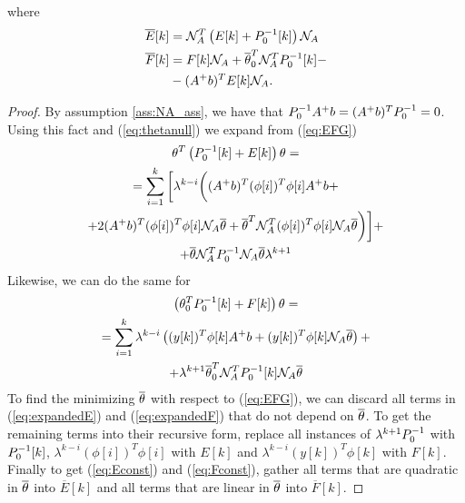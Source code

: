 where
\begin{align}
        \overline{E}[k] &= \mathcal{N}_A^T\left(E[k] + P_0^{-1}[k]\right)\mathcal{N}_A \label{eq:Econst}\\
        \overline{F}[k] &= F[k]\mathcal{N}_A + \overline{\theta}_0^T\mathcal{N}_A^TP_0^{-1}[k] - \notag \\
        &-(A^+b)^TE[k]\mathcal{N}_A \label{eq:Fconst}.
\end{align}
\begin{proof}
    By assumption \ref{ass:NA_ass}, we have that $P_0^{-1} A^+b = (A^+b)^TP_0^{-1} = 0$.
    Using this fact and (\ref{eq:thetanull}) we expand from (\ref{eq:EFG})
    \begin{equation}
        \begin{gathered}
            \theta^T\left(P_0^{-1}[k] + E[k]\right)\theta = \\
            = \sum\limits_{i=1}^k \bigg{[} \lambda^{k-i}\bigg{(}(A^+b)^T(\phi[i])^T\phi[i]A^+b
            + \\
            + 2(A^+b)^T(\phi[i])^T\phi[i]\mathcal{N}_A\overline{\theta} + \overline{\theta}^T\mathcal{N}_A^T(\phi[i])^T\phi[i]\mathcal{N}_A\overline{\theta} \bigg{)} \bigg{]} + \\
            + \overline{\theta}\mathcal{N}_A^TP_0^{-1}\mathcal{N}_A\overline{\theta}\lambda^{k+1}
        \end{gathered}
        \label{eq:expandedE}
    \end{equation}
    Likewise, we can do the same for 
    \begin{equation}
        \begin{gathered}
            \left(\theta_0^TP_0^{-1}[k] + F[k]\right)\theta = \\
            = \sum\limits_{i=1}^k \lambda^{k-i}\left((y[k])^T\phi[k]A^+b + (y[k])^T\phi[k]\mathcal{N}_A\overline{\theta}\right) + \\
            + \lambda^{k+1}\overline{\theta}_0^T\mathcal{N}_A^TP_0^{-1}[k]\mathcal{N}_A\overline{\theta}
        \end{gathered}
        \label{eq:expandedF}
    \end{equation}
    To find the minimizing $\overline{\theta}$ with respect to (\ref{eq:EFG}), we can discard
    all terms in (\ref{eq:expandedE}) and (\ref{eq:expandedF}) that do not depend on $\overline{\theta}$.
    To get the remaining terms into their recursive form, replace all instances of
    $\lambda^{k+1}P_0^{-1}$ with $P_0^{-1}[k]$, $\lambda^{k-i}(\phi[i])^T\phi[i]$ with $E[k]$ and
    $\lambda^{k-i}(y[k])^T\phi[k]$ with $F[k]$. Finally to get (\ref{eq:Econst}) and (\ref{eq:Fconst}),
    gather all terms that are quadratic in $\overline{\theta}$ into $\overline{E}[k]$ and all terms that are linear in
    $\overline{\theta}$ into $\overline{F}[k]$.
\end{proof}
